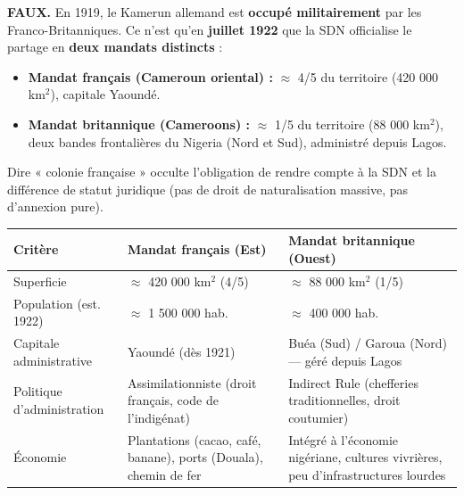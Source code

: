 \documentclass[11pt]{article}
\begin{document}
\begin{attention}
\textbf{FAUX.} En 1919, le Kamerun allemand est \textbf{occupé militairement} par les Franco-Britanniques. Ce n'est qu'en \textbf{juillet 1922} que la SDN officialise le partage en \textbf{deux mandats distincts} :
\begin{itemize}
    \item \textbf{Mandat français (Cameroun oriental) :} $\approx$ 4/5 du territoire (420 000 km$^2$), capitale Yaoundé.
    \item \textbf{Mandat britannique (Cameroons) :} $\approx$ 1/5 du territoire (88 000 km$^2$), deux bandes frontalières du Nigeria (Nord et Sud), administré depuis Lagos.
\end{itemize}
Dire « colonie française » occulte l'obligation de rendre compte à la SDN et la différence de statut juridique (pas de droit de naturalisation massive, pas d'annexion pure).
\end{attention}

\begin{exemplebox}
\begin{center}
\begin{tabularx}{\linewidth}{|l|X|X|}\hline
\textbf{Critère} & \textbf{Mandat français (Est)} & \textbf{Mandat britannique (Ouest)} \\ \hline
Superficie & $\approx$ 420 000 km$^2$ (4/5) & $\approx$ 88 000 km$^2$ (1/5) \\ \hline
Population (est. 1922) & $\approx$ 1 500 000 hab. & $\approx$ 400 000 hab. \\ \hline
Capitale administrative & Yaoundé (dès 1921) & Buéa (Sud) / Garoua (Nord) — géré depuis Lagos \\ \hline
Politique d'administration & Assimilationniste (droit français, code de l'indigénat) & Indirect Rule (chefferies traditionnelles, droit coutumier) \\ \hline
Économie & Plantations (cacao, café, banane), ports (Douala), chemin de fer & Intégré à l'économie nigériane, cultures vivrières, peu d'infrastructures lourdes \\ \hline
\end{tabularx}
\end{center}
\end{exemplebox}
\end{document}
